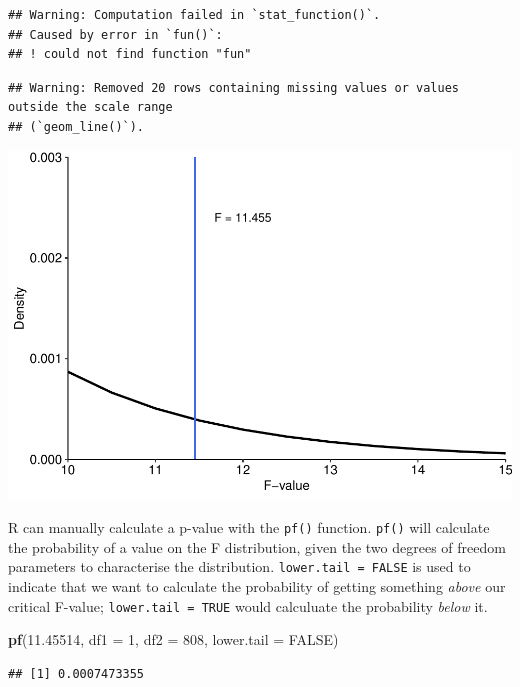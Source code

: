 \documentclass[
]{book}
\newenvironment{Shaded}{\begin{snugshade}}{\end{snugshade}}
\newcommand{\AttributeTok}[1]{\textcolor[rgb]{0.13,0.29,0.53}{#1}}
\newcommand{\ConstantTok}[1]{\textcolor[rgb]{0.56,0.35,0.01}{#1}}
\newcommand{\DecValTok}[1]{\textcolor[rgb]{0.00,0.00,0.81}{#1}}
\newcommand{\FloatTok}[1]{\textcolor[rgb]{0.00,0.00,0.81}{#1}}
\newcommand{\FunctionTok}[1]{\textcolor[rgb]{0.13,0.29,0.53}{\textbf{#1}}}
\newcommand{\NormalTok}[1]{#1}
\begin{document}
\begin{verbatim}
## Warning: Computation failed in `stat_function()`.
## Caused by error in `fun()`:
## ! could not find function "fun"
\end{verbatim}

\begin{verbatim}
## Warning: Removed 20 rows containing missing values or values outside the scale range
## (`geom_line()`).
\end{verbatim}

\includegraphics{_main_files/figure-latex/unnamed-chunk-352-1.pdf}

R can manually calculate a p-value with the \texttt{pf()} function. \texttt{pf()} will calculate the probability of a value on the F distribution, given the two degrees of freedom parameters to characterise the distribution. \texttt{lower.tail\ =\ FALSE} is used to indicate that we want to calculate the probability of getting something \emph{above} our critical F-value; \texttt{lower.tail\ =\ TRUE} would calculuate the probability \emph{below} it.

\begin{Shaded}
\begin{Highlighting}[]
\FunctionTok{pf}\NormalTok{(}\FloatTok{11.45514}\NormalTok{, }\AttributeTok{df1 =} \DecValTok{1}\NormalTok{, }\AttributeTok{df2 =} \DecValTok{808}\NormalTok{, }\AttributeTok{lower.tail =} \ConstantTok{FALSE}\NormalTok{)}
\end{Highlighting}
\end{Shaded}

\begin{verbatim}
## [1] 0.0007473355
\end{verbatim}
\end{document}
